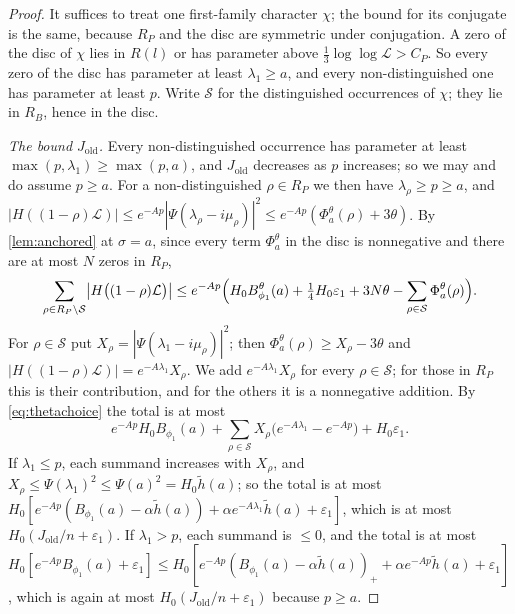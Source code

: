\documentclass[11pt]{amsart}
\numberwithin{equation}{section}
\theoremstyle{plain}
\theoremstyle{definition}
\theoremstyle{remark}
\newcommand{\LL}{\mathcal{L}}
\newcommand{\cS}{\mathcal{S}}
\newcommand{\eps}{\varepsilon}
\newcommand{\1}{\mathbf{1}}
\begin{document}
\begin{proof}
It suffices to treat one first-family character $\chi$; the bound for its conjugate is the same,
because $R_P$ and the disc are symmetric under conjugation. A zero of the disc of $\chi$ lies in $R(l)$
or has parameter above $\frac13\log\log\LL>C_P$. So every zero of the disc has parameter at least
$\lambda_1\ge a$, and every non-distinguished one has parameter at least $p$. Write $\cS$ for the
distinguished occurrences of $\chi$; they lie in $R_B$, hence in the disc.

\emph{The bound $J_{\mathrm{old}}$.} Every non-distinguished occurrence has parameter at least
$\max(p,\lambda_1)\ge\max(p,a)$, and $J_{\mathrm{old}}$ decreases as $p$ increases; so we may and do
assume $p\ge a$. For a non-distinguished $\rho\in R_P$ we then have $\lambda_\rho\ge p\ge a$, and
$|H((1-\rho)\LL)|\le e^{-Ap}|\Psi(\lambda_\rho-i\mu_\rho)|^2\le e^{-Ap}(\Phi^\theta_a(\rho)+3\theta)$. By
\cref{lem:anchored} at $\sigma=a$, since every term $\Phi^\theta_a$ in the disc is nonnegative and there are
at most $N$ zeros in $R_P$,
\[
  \sum_{\rho\in R_P\setminus\cS}\bigl|H\bigl((1-\rho)\LL\bigr)\bigr|\le
  e^{-Ap}\Bigl(H_0B^\theta_{\phi_1}(a)+\tfrac14H_0\eps_1+3N\theta-\sum_{\rho\in\cS}\Phi^\theta_a(\rho)\Bigr).
\]
For $\rho\in\cS$ put $X_\rho=|\Psi(\lambda_1-i\mu_\rho)|^2$; then $\Phi^\theta_a(\rho)\ge X_\rho-3\theta$ and
$|H((1-\rho)\LL)|=e^{-A\lambda_1}X_\rho$. We add $e^{-A\lambda_1}X_\rho$ for every $\rho\in\cS$; for those in $R_P$
this is their contribution, and for the others it is a nonnegative addition. By \eqref{eq:thetachoice}
the total is at most
\[
  e^{-Ap}H_0B_{\phi_1}(a)+\sum_{\rho\in\cS}X_\rho\bigl(e^{-A\lambda_1}-e^{-Ap}\bigr)+H_0\eps_1 .
\]
If $\lambda_1\le p$, each summand increases with $X_\rho$, and
$X_\rho\le\Psi(\lambda_1)^2\le\Psi(a)^2=H_0\tilde h(a)$; so the total is at most
$H_0[e^{-Ap}(B_{\phi_1}(a)-\alpha\tilde h(a))+\alpha e^{-A\lambda_1}\tilde h(a)+\eps_1]$, which is at most
$H_0(J_{\mathrm{old}}/n+\eps_1)$. If $\lambda_1>p$, each summand is $\le0$, and the total is at
most $H_0[e^{-Ap}B_{\phi_1}(a)+\eps_1]\le H_0[e^{-Ap}(B_{\phi_1}(a)-\alpha\tilde h(a))_++\alpha e^{-Ap}\tilde h(a)+\eps_1]$,
which is again at most $H_0(J_{\mathrm{old}}/n+\eps_1)$ because $p\ge a$.


\end{proof}
\end{document}
